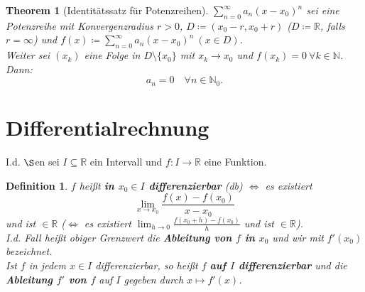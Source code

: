 \documentclass[titlepage,ngerman,a4paper,headsepline]{scrartcl}
\newcommand{\N}{\mathbb{N}}
\newcommand{\R}{\mathbb{R}}
\theoremstyle{named}
\newtheorem{namedtheorem}{Theorem} \counterwithin{namedtheorem}{section}
\theoremstyle{dotless}
\newtheorem*{definition}{Definition}
\begin{document}
\begin{namedtheorem}[Identitätssatz für Potenzreihen] \label{8.4:prop-IdentitätssatzFürPotenzreihe}
	$\sum_{n=0}^{\infty} a_{n} (x - x_{0})^{n}$ sei eine Potenzreihe mit Konvergenzradius $r > 0$, $D \coloneqq (x_{0} - r, x_{0} + r)$ ($D \coloneqq \R$, falls $r = \infty$) und $f(x) \coloneqq \sum_{n=0}^{\infty} a_{n} (x - x_{0})^{n} ~(x \in D)$. \\
	Weiter sei $(x_{k})$ eine Folge in $D \setminus \{ x_{0} \}$ mit $x_{k} \rightarrow x_{0}$ und $f(x_{k}) = 0 ~\forall k \in \N$. Dann:
	$$ a_{n} = 0 \quad \forall n \in \N_{0}. $$ 
\end{namedtheorem}


\newpage


\section{Differentialrechnung}

I.d. $\S$en sei $I \subseteq \R$ ein Intervall und $f \colon I \rightarrow \R$ eine Funktion. 

 
\begin{definition}
	$f$ hei{\ss}t \textbf{in $x_{0} \in I$ differenzierbar} (db) $\iff$ es existiert
		$$\lim_{x \rightarrow x_{0}} \frac{f(x) - f(x_{0})}{x - x_{0}} $$
	und ist $\in \R$ ($\iff$ es existiert $\lim_{h \rightarrow 0} \frac{f(x_{0} + h) - f(x_{0})}{h}$ und ist $\in \R$). \\
	I.d. Fall hei{\ss}t obiger Grenzwert die \textbf{Ableitung von $f$ in $x_{0}$} und wir mit $f'(x_{0})$ bezeichnet. \\
	Ist $f$ in jedem $x \in I$ differenzierbar, so hei{\ss}t $f$ \textbf{auf $I$ differenzierbar} und die \textbf{Ableitung $f'$ von $f$} auf $I$ gegeben durch $x \mapsto f'(x)$.
\end{definition}
\end{document}
